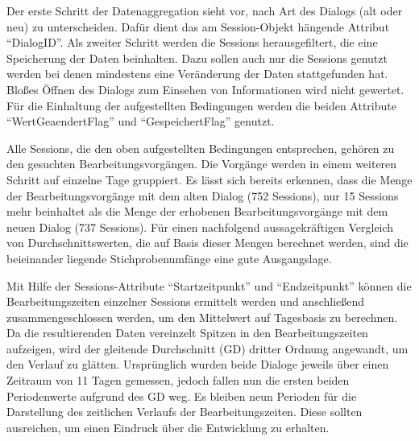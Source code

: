 Der erste Schritt der Datenaggregation sieht vor, nach Art des Dialogs (alt oder neu) zu unterscheiden. Dafür dient das am Session-Objekt hängende Attribut \enquote{DialogID}. Als zweiter Schritt werden die Sessions herausgefiltert, die eine Speicherung der Daten beinhalten. Dazu sollen auch nur die Sessions genutzt werden bei denen mindestens eine Veränderung der Daten stattgefunden hat. Bloßes Öffnen des Dialogs zum Einsehen von Informationen wird nicht gewertet. Für die Einhaltung der aufgestellten Bedingungen werden die beiden Attribute \enquote{WertGeaendertFlag} und \enquote{GespeichertFlag} genutzt.

Alle Sessions, die den oben aufgestellten Bedingungen entsprechen, gehören zu den gesuchten Bearbeitungsvorgängen. Die Vorgänge werden in einem weiteren Schritt auf einzelne Tage gruppiert. Es lässt sich bereits erkennen, dass die Menge der Bearbeitungsvorgänge mit dem alten Dialog (752 Sessions), nur 15 Sessions mehr beinhaltet als die Menge der erhobenen Bearbeitungsvorgänge mit dem neuen Dialog (737 Sessions). Für einen nachfolgend aussagekräftigen Vergleich von Durchschnittswerten, die auf Basis dieser Mengen berechnet werden, sind die beieinander liegende Stichprobenumfänge eine gute Ausgangslage.

Mit Hilfe der Sessions-Attribute \enquote{Startzeitpunkt} und \enquote{Endzeitpunkt} können die Bearbeitungszeiten einzelner Sessions ermittelt werden und anschließend zusammengeschlossen werden, um den Mittelwert auf Tagesbasis zu berechnen. Da die resultierenden Daten vereinzelt Spitzen in den Bearbeitungszeiten aufzeigen, wird der gleitende Durchschnitt (GD) dritter Ordnung angewandt, um den Verlauf zu glätten. Ursprünglich wurden beide Dialoge jeweils über einen Zeitraum von 11 Tagen gemessen, jedoch fallen nun die ersten beiden Periodenwerte aufgrund des GD weg. Es bleiben neun Perioden für die Darstellung des zeitlichen Verlaufs der Bearbeitungszeiten. Diese sollten ausreichen, um einen Eindruck über die Entwicklung zu erhalten.

